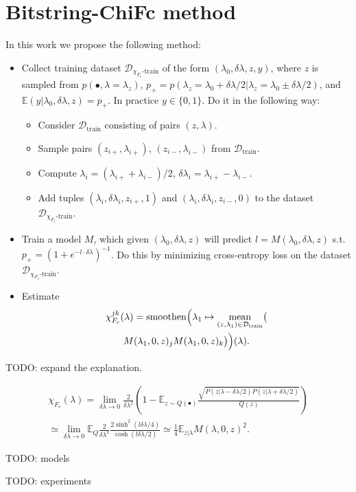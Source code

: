 \documentclass[american,aps,pra,reprint,floatfix,nofootinbib,superscriptaddress]{revtex4-2}
\DeclareMathOperator{\smoothen}{smoothen}
\DeclareMathOperator{\mean}{mean}
\begin{document}
\section{Bitstring-ChiFc method}
In this work we propose the following method:
\begin{itemize}
  \item Collect training dataset $\mathcal{D}_{\chi_{F_c}\textrm{-train}}$ of
  the form $(\lambda_0, \delta \lambda, z, y)$, where $z$ is sampled from
  $p(\bullet, \lambda=\lambda_{z})$,
  $p_{+} = p(\lambda_{z} = \lambda_0 + \delta \lambda / 2| \lambda_{z} = \lambda_0 \pm \delta \lambda / 2)$, and
    $\mathbb{E}(y|\lambda_0, \delta \lambda, z) = p_{+}$.
    In practice $y \in \{0, 1\}$.
    Do it in the following way:
    \begin{itemize}
      \item Consider $\mathcal{D}_{\textrm{train}}$ consisting of pairs
      $(z, \lambda)$.
      \item Sample pairs $(z_{i{+}}, \lambda_{i{+}})$,
      $(z_{i{-}}, \lambda_{i{-}})$ from $\mathcal{D}_{\textrm{train}}$.
      \item Compute $\lambda_i = (\lambda_{i{+}} + \lambda_{i{-}})/2$,
      $\delta \lambda_i = \lambda_{i{+}} - \lambda_{i{-}}$.
      \item Add tuples $(\lambda_i, \delta \lambda_i, z_{i{+}}, 1)$ and $(\lambda_i, \delta \lambda_i, z_{i{-}}, 0)$ to the dataset $\mathcal{D}_{\chi_{F_c}\textrm{-train}}$.
    \end{itemize}
  \item Train a model $M$, which given $(\lambda_0, \delta \lambda, z)$
  will predict $l = M(\lambda_0, \delta \lambda, z)$
  s.t. $p_{+} = (1+e^{-l \cdot \delta \lambda})^{-1}$.
  Do this by minimizing cross-entropy loss on the dataset
  $\mathcal{D}_{\chi_{F_c}\textrm{-train}}$.
  \item Estimate
  \begin{multline}
  \chi_{F_c}^{jk}(\lambda) = \smoothen\Bigl(
  \lambda_1 \mapsto \mean_{(z, \lambda_1) \in \mathcal{D}_{\textrm{train}}}
  \bigl(\\
  M(\lambda_1, 0, z)_{j}M(\lambda_1, 0, z)_{k}\bigr)\Bigr)(\lambda).
  \end{multline}
\end{itemize}

TODO: expand the explanation.

    \begin{multline*}
      \chi_{F_c}(\lambda) = \lim_{\delta \lambda\to 0} \frac2{\delta \lambda^2} \left(1 - \mathbb{E}_{z\sim Q(\bullet)} \frac{\sqrt{P(z|\lambda-\delta \lambda/2)P(z|\lambda+\delta \lambda/2)}}{Q(z)}\right)
      \\ \simeq \lim_{\delta \lambda\to 0} \mathbb{E}_{Q}\frac2{\delta \lambda^2}\frac{2\sinh^2(l\delta \lambda/4)}{\cosh(l\delta \lambda/2)} \simeq \frac14 \mathbb{E}_{z|\lambda} M(\lambda, 0, z)^2.
    \end{multline*}

TODO: models

TODO: experiments
\end{document}
